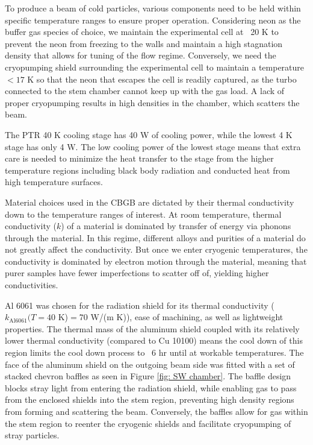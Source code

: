 To produce a beam of cold particles, various components need to be held within specific temperature ranges to ensure proper operation. Considering neon as the buffer gas species of choice, we maintain the experimental cell at ~20 K to prevent the neon from freezing to the walls and maintain a high stagnation density that allows for tuning of the flow regime. Conversely, we need the cryopumping shield surrounding the experimental cell to maintain a temperature $<17$ K so that the neon that escapes the cell is readily captured, as the turbo connected to the stem chamber cannot keep up with the gas load. A lack of proper cryopumping results in high densities in the chamber, which scatters the beam.

The PTR 40 K cooling stage has 40 W of cooling power, while the lowest 4 K stage has only 4 W. The low cooling power of the lowest stage means that extra care is needed to minimize the heat transfer to the stage from the higher temperature regions including black body radiation and conducted heat from high temperature surfaces.

Material choices used in the CBGB are dictated by their thermal conductivity down to the temperature ranges of interest. At room temperature, thermal conductivity ($k$) of a material is dominated by transfer of energy via phonons through the material. In this regime, different alloys and purities of a material do not greatly affect the conductivity. But once we enter cryogenic temperatures, the conductivity is dominated by electron motion through the material, meaning that purer samples have fewer imperfections to scatter off of, yielding higher conductivities.

Al 6061 was chosen for the radiation shield for its thermal conductivity ($k_{\mathrm{Al 6061}}(T=40$ K)$ = 70$ W/(m K)\cite{Bradley}), ease of machining, as well as lightweight properties. The thermal mass of the aluminum shield coupled with its relatively lower thermal conductivity (compared to Cu 10100) means the cool down of this region limits the cool down process to ~6 hr until at workable temperatures. The face of the aluminum shield on the outgoing beam side was fitted with a set of stacked chevron baffles as seen in Figure \ref{fig: SW chamber}. The baffle design blocks stray light from entering the radiation shield, while enabling gas to pass from the enclosed shields into the stem region, preventing high density regions from forming and scattering the beam. Conversely, the baffles allow for gas within the stem region to reenter the cryogenic shields and facilitate cryopumping of stray particles.

